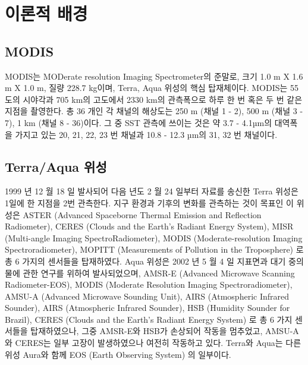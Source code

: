 \section{이론적 배경}

\subsection{MODIS}
MODIS는 MODerate resolution Imaging Spectrometer의 준말로, 크기 1.0 m X 1.6 m X 1.0 m, 질량 228.7 kg이며, Terra, Aqua 위성의 핵심 탑재체이다. MODIS는 55도의 시야각과 705 km의 고도에서 2330 km의 관측폭으로 하루 한 번 혹은 두 번 같은 지점을 촬영한다. 총 36 개인 각 채널의 해상도는 250 m (채널 1 - 2), 500 m (채널 3 - 7), 1 km (채널 8 - 36)이다. 그 중 SST 관측에 쓰이는 것은 약 3.7 - 4.1µm의 대역폭을 가지고 있는 20, 21, 22, 23 번 채널과 10.8 - 12.3 µm의 31, 32 번 채널이다. 


\subsection{Terra/Aqua 위성}
 1999 년 12 월 18 일 발사되어 다음 년도 2 월 24 일부터 자료를 송신한 Terra 위성은 1일에 한 지점을 2번 관측한다. 지구 환경과 기후의 변화를 관측하는 것이 목표인 이 위성은 ASTER (Advanced Spaceborne Thermal Emission and Reflection Radiometer), CERES (Clouds and the Earth's Radiant Energy System), MISR (Multi-angle Imaging SpectroRadiometer), MODIS (Moderate-resolution Imaging Spectroradiometer), MOPITT (Measurements of Pollution in the Troposphere) 로 총 6 가지의 센서들을 탑재하였다. Aqua 위성은 2002 년 5 월 4 일 지표면과 대기 중의 물에 관한 연구를 위하여 발사되었으며, AMSR-E (Advanced Microwave Scanning Radiometer-EOS), MODIS (Moderate Resolution Imaging Spectroradiometer), AMSU-A (Advanced Microwave Sounding Unit), AIRS (Atmospheric Infrared Sounder), AIRS (Atmospheric Infrared Sounder), HSB (Humidity Sounder for Brazil), CERES (Clouds and the Earth's Radiant Energy System) 로 총 6 가지 센서들을 탑재하였으나, 그중 AMSR-E와 HSB가 손상되어 작동을 멈추었고, AMSU-A와 CERES는 일부 고장이 발생하였으나 여전히 작동하고 있다. Terra와 Aqua는 다른 위성 Aura와 함께 EOS (Earth Observing System) 의 일부이다. 


